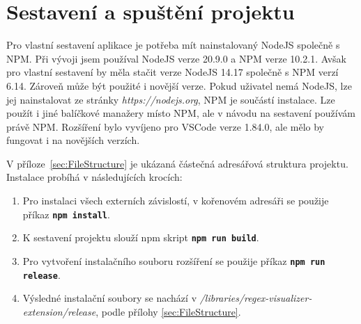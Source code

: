 \documentclass[czech,bachelor]{diploma}
\begin{document}
\MakeTitlePages

\listoffigures
\clearpage

\listofcode
\clearpage

\listoftables
\clearpage










\sloppy
\printbibliography[title={Literatura}, heading=bibintoc]

\appendix

\chapter{Sestavení a spuštění projektu}\label{sec:ProjectBuild}

Pro vlastní sestavení aplikace je potřeba mít nainstalovaný NodeJS společně s NPM.
Při vývoji jsem používal NodeJS verze 20.9.0 a NPM verze 10.2.1.
Avšak pro vlastní sestavení by měla stačit verze NodeJS 14.17 společně s NPM verzí 6.14.
Zároveň může být použité i novější verze. 
Pokud uživatel nemá NodeJS, lze jej nainstalovat ze stránky \textit{https://nodejs.org}, NPM je součástí instalace.
Lze použít i jiné balíčkové manažery místo NPM, ale v návodu na sestavení používám právě NPM.
Rozšíření bylo vyvíjeno pro VSCode verze 1.84.0, ale mělo by fungovat i na novějších verzích.

V příloze~\ref{sec:FileStructure} je ukázaná částečná adresářová struktura projektu.
Instalace probíhá v následujících krocích:

\begin{enumerate}
	\item Pro instalaci všech externích závislostí, v kořenovém adresáři se použije příkaz \texttt{\textbf{\textcolor{OliveGreen}{npm install}}}.
	\item K sestavení projektu slouží npm skript \texttt{\textbf{\textcolor{OliveGreen}{npm run build}}}.
	\item Pro vytvoření instalačního souboru rozšíření se použije příkaz \texttt{\textbf{\textcolor{OliveGreen}{npm run release}}}.
	\item Výsledné instalační soubory se nachází v \textit{/libraries/regex-visualizer-extension/release}, podle přílohy \ref{sec:FileStructure}.
\end{enumerate}
\end{document}
